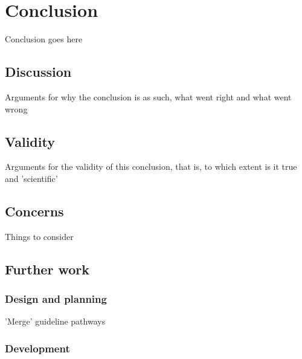 \chapter{Conclusion}
\label{ch:conclusion}

Conclusion goes here

\section{Discussion}

Arguments for why the conclusion is as such, what went right and what went wrong

\section{Validity}

Arguments for the validity of this conclusion, that is, to which extent is it true and 'scientific'

\section{Concerns}

Things to consider

\section{Further work}

\subsection{Design and planning}

'Merge' guideline pathways

\subsection{Development}


